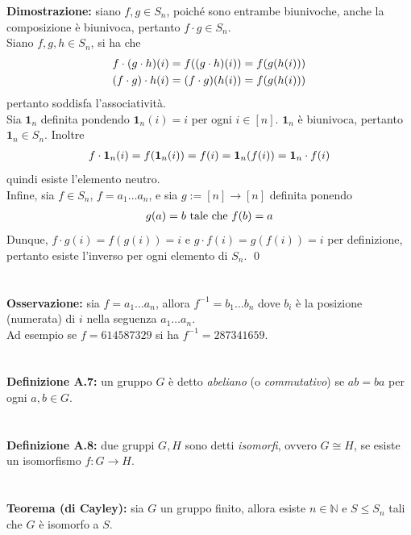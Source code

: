 \documentclass{article}
\begin{document}
\textbf{Dimostrazione:} siano $f, g \in S_n$, poiché sono entrambe biunivoche, anche la composizione è biunivoca, pertanto $f \cdot g \in S_n$. \\
Siano $f, g, h \in S_n$, si ha che
\begin{gather}
    f \cdot (g \cdot h)(i) = f((g \cdot h)(i)) = f(g(h(i))) \notag \\
    (f \cdot g) \cdot h(i) = (f \cdot g)(h(i)) = f(g(h(i))) \notag
\end{gather}
pertanto soddisfa l'associatività. \\
Sia $\mathbf{1}_n$ definita pondendo $\mathbf{1}_n(i) = i$ per ogni $i \in [n]$. $\mathbf{1}_n$ è biunivoca, pertanto $\mathbf{1}_n \in S_n$. Inoltre
\begin{gather}
    f \cdot \mathbf{1}_n (i) = f(\mathbf{1}_n(i)) = f(i) = \mathbf{1}_n (f(i)) = \mathbf{1}_n \cdot f (i) \notag
\end{gather}
quindi esiste l'elemento neutro. \\
Infine, sia $f \in S_n$, $f = a_1 \dots a_n$, e sia $g := [n] \longrightarrow [n]$ definita ponendo
\begin{gather}
    g(a) = b \text{ tale che } f(b) = a \notag
\end{gather}
Dunque, $f \cdot g (i) = f(g(i)) = i$ e $g \cdot f (i) = g(f(i)) = i$ per definizione, pertanto esiste l'inverso per ogni elemento di $S_n$. \qed \\ \\ \\
\textbf{Osservazione:} sia $f = a_1 \dots a_n$, allora $f^{-1} = b_1 \dots b_n$ dove $b_i$ è la posizione (numerata) di $i$ nella seguenza $a_1 \dots a_n$. \\
Ad esempio se $f = 614587329$ si ha $f^{-1} = 287341659$. \\ \\ \\
\textbf{Definizione A.7:} un gruppo $G$ è detto \textit{abeliano} (o \textit{commutativo}) se $ab = ba$ per ogni $a, b \in G$. \\ \\ \\
\textbf{Definizione A.8:} due gruppi $G, H$ sono detti \textit{isomorfi}, ovvero $G \cong H$, se esiste un isomorfismo $f : G \longrightarrow H$. \\ \\ \\
\textbf{Teorema (di Cayley):} sia $G$ un gruppo finito, allora esiste $n \in \mathbb{N}$ e $S \leq S_n$ tali che $G$ è isomorfo a $S$. \\
\end{document}
